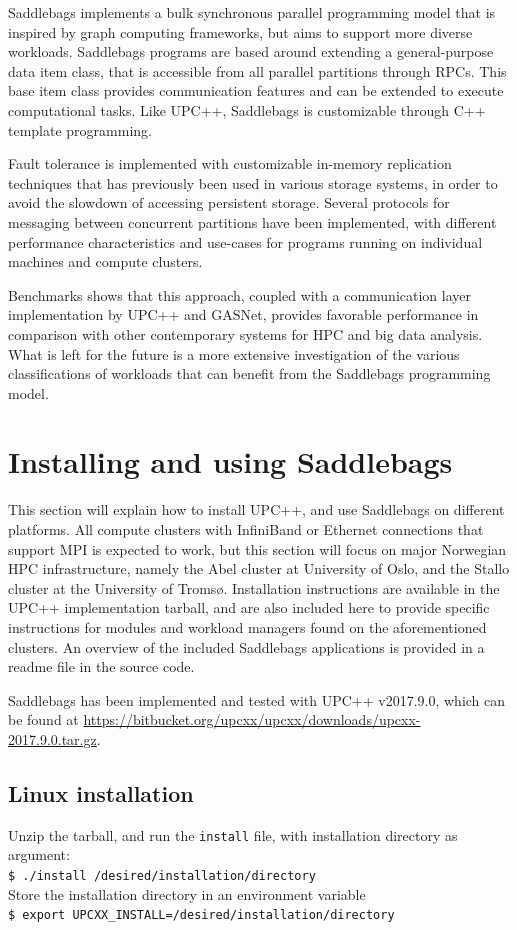 \documentclass{uit-report}
\begin{document}
Saddlebags implements a bulk synchronous parallel programming model that is inspired by graph computing frameworks, but aims to support more diverse workloads. Saddlebags programs are based around extending a general-purpose data item class, that is accessible from all parallel partitions through RPCs. This base item class provides communication features and can be extended to execute computational tasks. Like UPC++, Saddlebags is customizable through C++ template programming.

Fault tolerance is implemented with customizable in-memory replication techniques that has previously been used in various storage systems, in order to avoid the slowdown of accessing persistent storage. Several protocols for messaging between concurrent partitions have been implemented, with different performance characteristics and use-cases for programs running on individual machines and compute clusters.

Benchmarks shows that this approach, coupled with a communication layer implementation by UPC++ and GASNet, provides favorable performance in comparison with other contemporary systems for HPC and big data analysis. What is left for the future is a more extensive investigation of the various classifications of workloads that can benefit from the Saddlebags programming model.

\pagebreak


\newpage
\mbox{} \pagebreak
\appendix
\chapter{Installing and using Saddlebags}
This section will explain how to install UPC++, and use Saddlebags on different platforms. All compute clusters with InfiniBand or Ethernet connections that support MPI is expected to work, but this section will focus on major Norwegian HPC infrastructure, namely the Abel cluster at University of Oslo, and the Stallo cluster at the University of Tromsø. Installation instructions are available in the UPC++ implementation tarball, and are also included here to provide specific instructions for modules and workload managers found on the aforementioned clusters. An overview of the included Saddlebags applications is provided in a readme file in the source code.

Saddlebags has been implemented and tested with UPC++ v2017.9.0, which can be found at {\url{https://bitbucket.org/upcxx/upcxx/downloads/upcxx-2017.9.0.tar.gz}}.
\section{Linux installation}\label{section:installinux}
Unzip the tarball, and run the \texttt{install} file, with installation directory as argument:\\
\phantom{11111} \texttt{\$ ./install /desired/installation/directory}\\
Store the installation directory in an environment variable\\
\phantom{11111} \texttt{\$ export UPCXX\_INSTALL=/desired/installation/directory}\\
\end{document}

